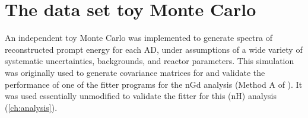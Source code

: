 




\section{The data set toy Monte Carlo}
\label{sec:lbnl_toymc}

An independent toy Monte Carlo was implemented
to generate spectra of reconstructed prompt energy for each AD,
under assumptions of a wide variety of systematic uncertainties,
backgrounds, and reactor parameters.
This simulation was originally \cite{lbnl_toymc,p12e_fitter,p14a_fitter} used to generate covariance matrices for
and validate the performance of
one of the fitter programs for the nGd analysis
(Method A of \cite{ngd2016}).
It was used essentially unmodified to validate the fitter for this (nH) analysis
(\cref{ch:analysis}).

